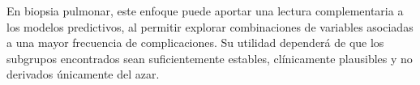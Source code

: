 En biopsia pulmonar, este enfoque puede aportar una lectura complementaria a los modelos predictivos, al permitir explorar combinaciones de variables asociadas a una mayor frecuencia de complicaciones. Su utilidad dependerá de que los subgrupos encontrados sean suficientemente estables, clínicamente plausibles y no derivados únicamente del azar.


